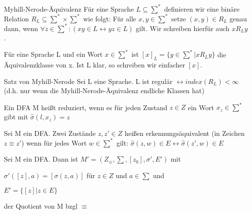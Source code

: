\documentclass[avery5371, frame]{flashcards}
\begin{document}
\begin{flashcard}[Definition]{Myhill-Nerode-Äquivalenz}
    Für eine Sprache $L\subseteq \sum^*$ definieren wir eine binäre Relation $R_L \subseteq \sum^* \times \sum^*$ wie folgt: Für alle $x,y\in \sum^*$ setze $(x,y)\in R_L$ genau dann, wenn $\forall z \in \sum^* :(xy\in L \leftrightarrow yz \in L)$ gilt. Wir schreiben hierfür auch $x R_L y$.
\end{flashcard}

\begin{flashcard}[Definition]{ Für eine Sprache L und ein Wort $x\in \sum^*$ ist $[x]_L=\{y\in\sum^* | x R_L y \}$ }
    die Äquivalenzklasse von x. Ist L klar, so schreiben wir einfacher $[x]$.
\end{flashcard}

\begin{flashcard}[Satz]{ Satz  von Myhill-Nerode}
    Sei L eine Sprache. L ist regulär $\leftrightarrow index(R_L)< \infty$
    (d.h. nur wenn die Myhill-Nerode-Äquivalenz endliche Klassen hat)
\end{flashcard}

\begin{flashcard}[Definition]{ Ein DFA M heißt reduziert,}
    wenn es für jeden Zustand $z \in Z$ ein Wort $x_z\in \sum^*$ gibt mit $\hat{\sigma}(l, x_z)=z$
\end{flashcard}

\begin{flashcard}[Definition]{ Sei M ein DFA. Zwei Zustände $z,z'\in Z$ heißen erkennungsäquivalent }(in Zeichen $z\equiv z'$) wenn für jedes Wort $w\in \sum^*$ gilt: $\hat{\sigma}(z,w)\in E \leftrightarrow \hat{\sigma}(z',w)\in E$
\end{flashcard}

\begin{flashcard}[Definition]{ Sei M ein DFA. Dann ist $M'=(Z_{\equiv},\sum, [z_0],\sigma', E')$ mit}\begin{itemize*}
        \item $\sigma'([z],a)=[\sigma (z,a)]$ für $z\in Z$ und $a\in \sum$ und
        \item $E'=\{[z]|z\in E\}$
    \end{itemize*}
    der Quotient von M bzgl $\equiv$
\end{flashcard}
\end{document}

